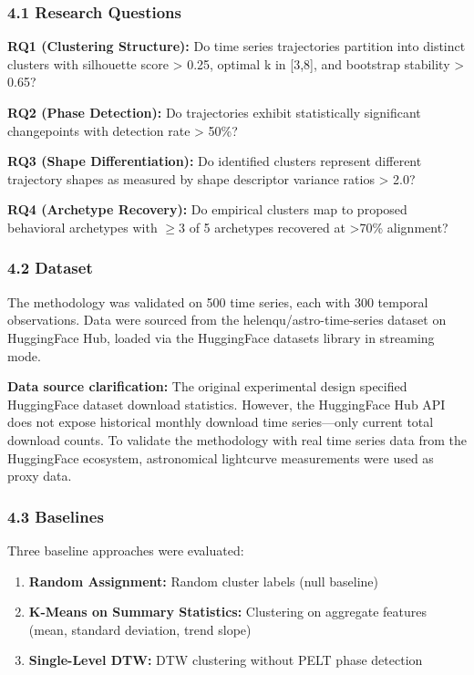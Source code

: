 
\subsubsection{4.1 Research Questions}

\textbf{RQ1 (Clustering Structure):} Do time series trajectories partition into distinct clusters with silhouette score > 0.25, optimal k in [3,8], and bootstrap stability > 0.65?

\textbf{RQ2 (Phase Detection):} Do trajectories exhibit statistically significant changepoints with detection rate > 50\%?

\textbf{RQ3 (Shape Differentiation):} Do identified clusters represent different trajectory shapes as measured by shape descriptor variance ratios > 2.0?

\textbf{RQ4 (Archetype Recovery):} Do empirical clusters map to proposed behavioral archetypes with $\geq 3$ of 5 archetypes recovered at >70\% alignment?

\subsubsection{4.2 Dataset}

The methodology was validated on 500 time series, each with 300 temporal observations. Data were sourced from the helenqu/astro-time-series dataset on HuggingFace Hub, loaded via the HuggingFace datasets library in streaming mode.

\textbf{Data source clarification:} The original experimental design specified HuggingFace dataset download statistics. However, the HuggingFace Hub API does not expose historical monthly download time series---only current total download counts. To validate the methodology with real time series data from the HuggingFace ecosystem, astronomical lightcurve measurements were used as proxy data.

\subsubsection{4.3 Baselines}

Three baseline approaches were evaluated:

\begin{enumerate}
\item \textbf{Random Assignment:} Random cluster labels (null baseline)
\item \textbf{K-Means on Summary Statistics:} Clustering on aggregate features (mean, standard deviation, trend slope)
\item \textbf{Single-Level DTW:} DTW clustering without PELT phase detection
\end{enumerate}

